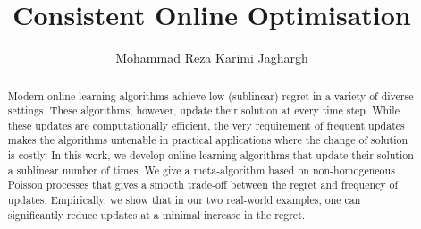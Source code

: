 \documentclass[11pt,a4paper]{amsbook}
\theoremstyle{definition}
\theoremstyle{remark}
\numberwithin{section}{chapter}
\numberwithin{equation}{chapter}
\begin{document}
\frontmatter


\setcounter{page}{0}
\clearpage\thispagestyle{empty}\mbox{}\clearpage
\title{Consistent Online Optimisation}
\author{Mohammad Reza Karimi Jaghargh}
\address{ETH Z\"urich, Switzerland}
\maketitle

\begin{abstract}
    Modern online learning algorithms achieve low (sublinear) regret in a variety of diverse settings. These algorithms, however, update their solution at every time step. While these updates are computationally efficient, the very requirement of frequent updates makes the algorithms untenable in practical applications where the change of solution is costly. In this work, we develop online learning algorithms that update their solution a sublinear number of times. We give a meta-algorithm based on non-homogeneous Poisson processes that gives a smooth trade-off between the regret and frequency of updates. Empirically, we show that in our two real-world examples, one can significantly reduce updates at a minimal increase in the regret.
\end{abstract}

\setcounter{page}{4}
\tableofcontents

\mainmatter








\appendix


\backmatter



\newpage

\end{document}
